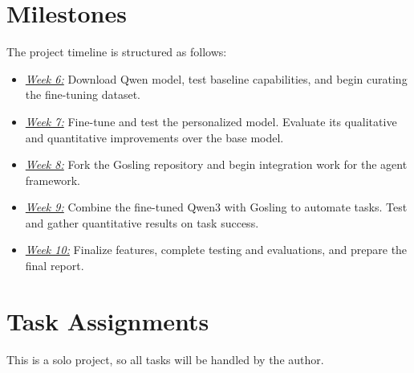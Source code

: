 \documentclass[conference]{IEEEtran}
\begin{document}
\section{Milestones}
The project timeline is structured as follows:
\begin{itemize}
    \item \textit{\uline{Week 6:}} Download Qwen model, test baseline capabilities, and begin curating the fine-tuning dataset.
    \item \textit{\uline{Week 7:}} Fine-tune and test the personalized model. Evaluate its qualitative and quantitative improvements over the base model.
    \item \textit{\uline{Week 8:}} Fork the Gosling repository and begin integration work for the agent framework.
    \item \textit{\uline{Week 9:}} Combine the fine-tuned Qwen3 with Gosling to automate tasks. Test and gather quantitative results on task success.
    \item \textit{\uline{Week 10:}} Finalize features, complete testing and evaluations, and prepare the final report.
\end{itemize}

\section{Task Assignments}
This is a solo project, so all tasks will be handled by the author.





\end{document}
